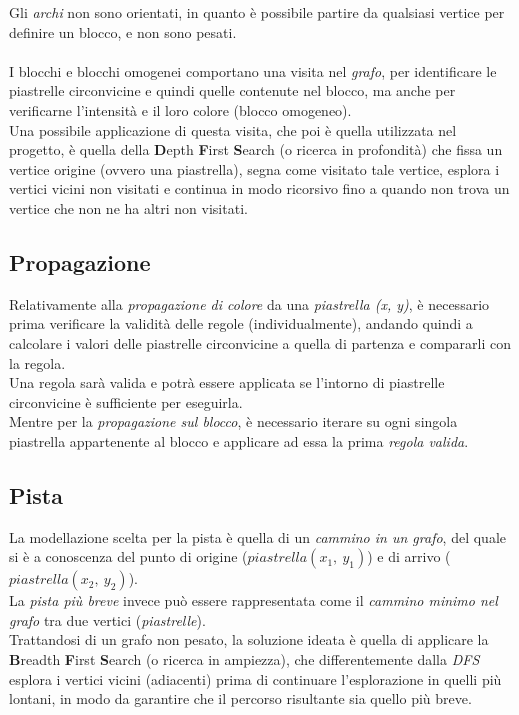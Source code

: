 \documentclass{article}
\begin{document}
Gli \textit{archi} non sono orientati, in quanto è possibile partire da qualsiasi vertice per definire un blocco, e non sono pesati.
\\ \\
I blocchi e blocchi omogenei comportano una visita nel \textit{grafo}, per identificare le piastrelle circonvicine e quindi quelle contenute nel blocco, ma anche per verificarne l'intensità e il loro colore (blocco omogeneo).\\
Una possibile applicazione di questa visita, che poi è quella utilizzata nel progetto, è quella della \textbf{D}epth \textbf{F}irst \textbf{S}earch (o ricerca in profondità) che fissa un vertice origine (ovvero una piastrella), segna come visitato tale vertice, esplora i vertici vicini non visitati e continua in modo ricorsivo fino a quando non trova un vertice che non ne ha altri non visitati.

\subsection*{Propagazione}
Relativamente alla \textit{propagazione di colore} da una \textit{piastrella (x, y)}, è necessario prima verificare la validità delle regole (individualmente), andando quindi a calcolare i valori delle piastrelle circonvicine a quella di partenza e compararli con la regola.\\
Una regola sarà valida e potrà essere applicata se l'intorno di piastrelle circonvicine è sufficiente per eseguirla.\\
Mentre per la \textit{propagazione sul blocco}, è necessario iterare su ogni singola piastrella appartenente al blocco e applicare ad essa la prima \textit{regola valida}.

\subsection*{Pista}\label{sec:pista}
La modellazione scelta per la pista è quella di un \textit{cammino in un grafo}, del quale si è a conoscenza del punto di origine ($piastrella(x_1,\ y_1)$) e di arrivo ($piastrella(x_2,\ y_2)$).\\
La \textit{pista più breve} invece può essere rappresentata come il \textit{cammino minimo nel grafo} tra due vertici (\textit{piastrelle}).\\
Trattandosi di un grafo non pesato, la soluzione ideata è quella di applicare la \textbf{B}readth \textbf{F}irst \textbf{S}earch (o ricerca in ampiezza), che differentemente dalla \textit{DFS} esplora i vertici vicini (adiacenti) prima di continuare l'esplorazione in quelli più lontani, in modo da garantire che il percorso risultante sia quello più breve.
\end{document}
